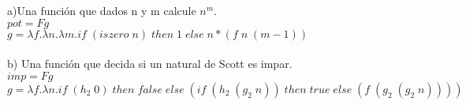 \documentclass{article}
\begin{document}
\begin{flushleft}
	a)Una función que dados n y m calcule $n^{m}.$\\
	$pot = F g$ \\
	$g = \lambda f.\lambda n.\lambda m.if\;(iszero\;n)\;then\;1\;else\;n*(f\;n\;(m-1))$ \\ \ \\
	b) Una función que decida si un natural de Scott es impar. \\
	$imp = F g$ \\
	$g = \lambda f.\lambda n.if\;(h_{2}\;0)\;then\;false\;else\;(if\;(h_{2}\;(g_{2}\;n))\;then\;true\;else\;(f\;(g_{2}\;(g_{2}\;n))))$ \\
	\end{flushleft}
\end{document}
